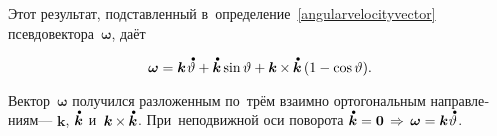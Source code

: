\begin{otherlanguage}{russian}
Этот результат, подставленный в~определение~\eqref{angularvelocityvector} псевдо\-вектора~$\bm{\omega}$, даёт

\nopagebreak\vspace{-0.5em}\begin{equation}
\bm{\omega} = \bm{k} \hspace{.2ex} \mathdotabove{\vartheta}
+ \mathdotabove{\bm{k}} \operatorname{sin} \vartheta
+ \bm{k} \hspace{-0.1ex}\times\hspace{-0.1ex} \mathdotabove{\bm{k}} \left( 1 - \operatorname{cos} \vartheta \right) \hspace{-0.4ex}.
\end{equation}

\vspace{-0.3em}\noindent
Вектор~$\bm{\omega}$ получился разложенным по~трём взаимно ортогональным направлениям\:--- $\bm{k}$, $\mathdotabove{\bm{k}}$ и~${\bm{k} \hspace{-0.1ex}\times\hspace{-0.1ex} \mathdotabove{\bm{k}}}$. При~неподвижной оси поворота ${\mathdotabove{\bm{k}} = \bm{0} \,\Rightarrow\, \bm{\omega} = \bm{k} \hspace{.1ex} \mathdotabove{\vartheta}}$.


\end{otherlanguage}
